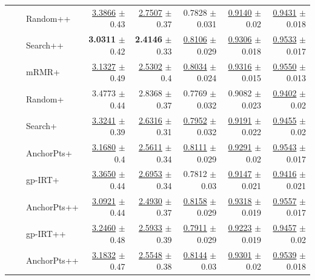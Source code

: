 \begin{longtable}{llp{}rrrrr}
 &  & Random++ & \underline{3.3866} {\scriptsize $\pm$ 0.43} & \underline{2.7507} {\scriptsize $\pm$ 0.37} & 0.7828 {\scriptsize $\pm$ 0.031} & \underline{0.9140} {\scriptsize $\pm$ 0.02} & \underline{0.9431} {\scriptsize $\pm$ 0.018} \\
 &  & Search++ & \textbf{3.0311} {\scriptsize $\pm$ 0.42} & \textbf{2.4146} {\scriptsize $\pm$ 0.33} & \underline{0.8106} {\scriptsize $\pm$ 0.029} & \underline{0.9306} {\scriptsize $\pm$ 0.018} & \underline{0.9533} {\scriptsize $\pm$ 0.017} \\
 &  & mRMR+ & \underline{3.1327} {\scriptsize $\pm$ 0.49} & \underline{2.5302} {\scriptsize $\pm$ 0.4} & \underline{0.8034} {\scriptsize $\pm$ 0.024} & \underline{0.9316} {\scriptsize $\pm$ 0.015} & \underline{0.9550} {\scriptsize $\pm$ 0.013} \\
 &  & Random+ & 3.4773 {\scriptsize $\pm$ 0.44} & 2.8368 {\scriptsize $\pm$ 0.37} & 0.7769 {\scriptsize $\pm$ 0.032} & 0.9082 {\scriptsize $\pm$ 0.023} & \underline{0.9402} {\scriptsize $\pm$ 0.02} \\
 &  & Search+ & \underline{3.3241} {\scriptsize $\pm$ 0.39} & \underline{2.6316} {\scriptsize $\pm$ 0.31} & \underline{0.7952} {\scriptsize $\pm$ 0.032} & \underline{0.9191} {\scriptsize $\pm$ 0.022} & \underline{0.9455} {\scriptsize $\pm$ 0.02} \\
 &  & AnchorPts+ & \underline{3.1680} {\scriptsize $\pm$ 0.4} & \underline{2.5611} {\scriptsize $\pm$ 0.34} & \underline{0.8111} {\scriptsize $\pm$ 0.029} & \underline{0.9291} {\scriptsize $\pm$ 0.02} & \underline{0.9543} {\scriptsize $\pm$ 0.017} \\
 &  & gp-IRT+ & \underline{3.3650} {\scriptsize $\pm$ 0.44} & \underline{2.6953} {\scriptsize $\pm$ 0.34} & 0.7812 {\scriptsize $\pm$ 0.03} & \underline{0.9147} {\scriptsize $\pm$ 0.021} & \underline{0.9416} {\scriptsize $\pm$ 0.021} \\
 &  & AnchorPts++ & \underline{3.0921} {\scriptsize $\pm$ 0.44} & \underline{2.4930} {\scriptsize $\pm$ 0.37} & \underline{0.8158} {\scriptsize $\pm$ 0.029} & \underline{0.9318} {\scriptsize $\pm$ 0.019} & \underline{0.9557} {\scriptsize $\pm$ 0.017} \\
 &  & gp-IRT++ & \underline{3.2460} {\scriptsize $\pm$ 0.48} & \underline{2.5933} {\scriptsize $\pm$ 0.39} & \underline{0.7911} {\scriptsize $\pm$ 0.029} & \underline{0.9223} {\scriptsize $\pm$ 0.019} & \underline{0.9457} {\scriptsize $\pm$ 0.02} \\
 &  & AnchorPts++ & \underline{3.1832} {\scriptsize $\pm$ 0.47} & \underline{2.5548} {\scriptsize $\pm$ 0.38} & \underline{0.8144} {\scriptsize $\pm$ 0.03} & \underline{0.9301} {\scriptsize $\pm$ 0.02} & \underline{0.9539} {\scriptsize $\pm$ 0.018} \\

\end{longtable}
